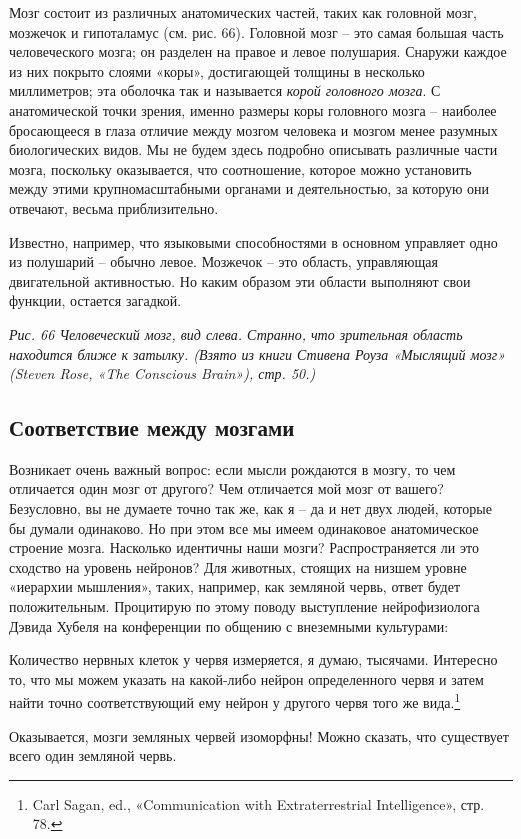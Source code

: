 \documentclass[../main.tex]{subfiles}
\begin{document}
Мозг состоит из различных анатомических частей, таких как головной мозг, мозжечок и гипоталамус (см. рис. 66). Головной мозг \--- это самая большая часть человеческого мозга; он разделен на правое и левое полушария. Снаружи каждое из них покрыто слоями «коры», достигающей толщины в несколько миллиметров; эта оболочка так и называется \emph{корой головного мозга}. С анатомической точки зрения, именно размеры коры головного мозга \--- наиболее бросающееся в глаза отличие между мозгом человека и мозгом менее разумных биологических видов. Мы не будем здесь подробно описывать различные части мозга, поскольку оказывается, что соотношение, которое можно установить между этими крупномасштабными органами и деятельностью, за которую они отвечают, весьма приблизительно.

Известно, например, что языковыми способностями в основном управляет одно из полушарий \--- обычно левое. Мозжечок \--- это область, управляющая двигательной активностью. Но каким образом эти области выполняют свои функции, остается загадкой.

\emph{Рис. 66 Человеческий мозг, вид слева. Странно, что зрительная область находится ближе к затылку. (Взято из книги Стивена Роуза «Мыслящий мозг» (Steven Rose, «The Conscious Brain»), стр. 50.)}


\subsection{Соответствие между мозгами}

Возникает очень важный вопрос: если мысли рождаются в мозгу, то чем отличается один мозг от другого? Чем отличается мой мозг от вашего? Безусловно, вы не думаете точно так же, как я \--- да и нет двух людей, которые бы думали одинаково. Но при этом все мы имеем одинаковое анатомическое строение мозга. Насколько идентичны наши мозги? Распространяется ли это сходство на уровень нейронов? Для животных, стоящих на низшем уровне «иерархии мышления», таких, например, как земляной червь, ответ будет положительным. Процитирую по этому поводу выступление нейрофизиолога Дэвида Хубеля на конференции по общению с внеземными культурами:

Количество нервных клеток у червя измеряется, я думаю, тысячами. Интересно то, что мы можем указать на какой-либо нейрон определенного червя и затем найти точно соответствующий ему нейрон у другого червя того же вида.\footnote{Carl Sagan, ed., «Communication with Extraterrestrial Intelligence», стр. 78.}

Оказывается, мозги земляных червей изоморфны! Можно сказать, что существует всего один земляной червь.
\end{document}
